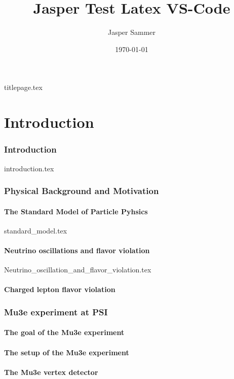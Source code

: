 \documentclass[a4paper, 12pt]{article}
\title{Jasper Test Latex VS-Code}
\author{Jasper Sammer}
\date{\today}
\begin{document}
\onehalfspacing
{titlepage.tex}



\newpage
{}
\tableofcontents
\newpage
{}

\part{Introduction}
\section{Introduction}
{introduction.tex}

\section{Physical Background and Motivation}
\subsection{The Standard Model of Particle Pyhsics}
{standard_model.tex}

\subsection{Neutrino oscillations and flavor violation}
{Neutrino_oscillation_and_flavor_violation.tex}
\subsection{Charged lepton flavor violation}

\section{Mu3e experiment at PSI}
\subsection{The goal of the Mu3e experiment}
\subsection{The setup of the Mu3e experiment}
\subsection{The Mu3e vertex detector}
\end{document}
